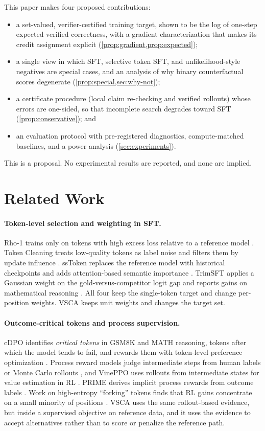 \documentclass{article}
\newcommand{\vsca}{\textsc{VSCA}}
\theoremstyle{plain}
\theoremstyle{remark}
\begin{document}
This paper makes four proposed contributions:
\begin{itemize}
  \item a set-valued, verifier-certified training target, shown to be the log of one-step expected verified correctness, with a gradient characterization that makes its credit assignment explicit (\cref{prop:gradient,prop:expected});
  \item a single view in which SFT, selective token SFT, and unlikelihood-style negatives are special cases, and an analysis of why binary counterfactual scores degenerate (\cref{prop:special,sec:why-not});
  \item a certificate procedure (local claim re-checking and verified rollouts) whose errors are one-sided, so that incomplete search degrades toward SFT (\cref{prop:conservative}); and
  \item an evaluation protocol with pre-registered diagnostics, compute-matched baselines, and a power analysis (\cref{sec:experiments}).
\end{itemize}
This is a proposal. No experimental results are reported, and none are implied.

\section{Related Work}
\label{sec:related}
\paragraph{Token-level selection and weighting in SFT.} Rho-1 trains only on tokens with high excess loss relative to a reference model \citep{rho1}. Token Cleaning treats low-quality tokens as label noise and filters them by update influence \citep{tokenCleaning}. ssToken replaces the reference model with historical checkpoints and adds attention-based semantic importance \citep{ssToken}. TrimSFT applies a Gaussian weight on the gold-versus-competitor logit gap and reports gains on mathematical reasoning \citep{trimSFT}. All four keep the single-token target and change per-position weights. \vsca{} keeps unit weights and changes the target set.

\paragraph{Outcome-critical tokens and process supervision.} cDPO identifies \emph{critical tokens} in GSM8K and MATH reasoning, tokens after which the model tends to fail, and rewards them with token-level preference optimization \citep{cdpo}. Process reward models judge intermediate steps from human labels \citep{lightman} or Monte Carlo rollouts \citep{mathShepherd}, and VinePPO uses rollouts from intermediate states for value estimation in RL \citep{vineppo}. PRIME derives implicit process rewards from outcome labels \citep{prime}. Work on high-entropy ``forking'' tokens finds that RL gains concentrate on a small minority of positions \citep{forkingTokens}. \vsca{} uses the same rollout-based evidence, but inside a supervised objective on reference data, and it uses the evidence to accept alternatives rather than to score or penalize the reference path.
\end{document}
